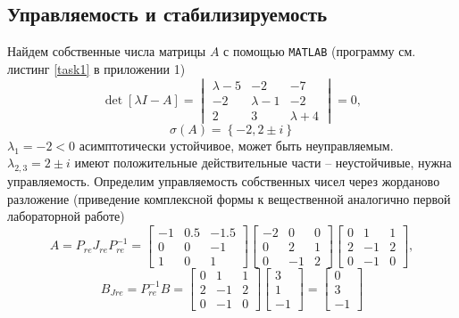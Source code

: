 \documentclass[a4paper, 12pt]{article}
\begin{document}
    \subsection{Управляемость и стабилизируемость}
    Найдем собственные числа матрицы $A$ с помощью \texttt{MATLAB} (программу см. листинг \ref{task1} в приложении 1)
    $$
    \det{\left[\lambda I-A\right]}=\begin{vmatrix}
        \lambda-5 &-2 &-7\\
        -2 &\lambda-1 &-2\\
        2 &3 &\lambda+4
    \end{vmatrix}=0,
    $$
    $$
    \sigma\left(A\right)=\left\{-2, 2\pm i\right\}
    $$
    $\lambda_1=-2<0$ асимптотически устойчивое, может быть неуправляемым. $\lambda_{2,3}=2\pm i$ имеют
    положительные действительные части -- неустойчивые, нужна управляемость. Определим управляемость
    собственных чисел через жорданово разложение (приведение комплексной формы к вещественной аналогично первой
    лабораторной работе)
    $$
    A=P_{re}J_{re}P_{re}^{-1}=\begin{bmatrix}
    -1    &0.5   &-1.5\\
    0         &0   &-1\\
    1         &0    &1
    \end{bmatrix}\begin{bmatrix}
    -2     &0     &0\\
     0     &2     &1\\
     0    &-1     &2
    \end{bmatrix}\begin{bmatrix}
    0     &1     &1\\
     2    &-1     &2\\
     0    &-1     &0
    \end{bmatrix},
    $$
    $$
    B_{Jre}=P_{re}^{-1}B=\begin{bmatrix}
        0     &1     &1\\
         2    &-1     &2\\
         0    &-1     &0
        \end{bmatrix}\begin{bmatrix}
            3\\
            1\\
            -1
        \end{bmatrix}=\begin{bmatrix}
        0\\
     3\\
    -1
    \end{bmatrix}
    $$
\end{document}
